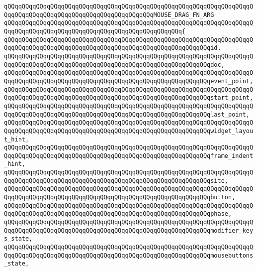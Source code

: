 \verb|qQQqqQQqqQQqqQQqqQQqqQQqqQQqqQQqqQQqqQQqqQQqqQQqqQQqqQQqqQQqqQQqqQQqqQQqqQQqqQQqqQQqqQQqqQQqqQQqqQQqqQQqqQQqqQQqMOUSE_DRAG_FN_ARG|\newline
\verb|qQQqqQQqqQQqqQQqqQQqqQQqqQQqqQQqqQQqqQQqqQQqqQQqqQQqqQQqqQQqqQQqqQQqqQQqqQQqqQQqqQQqqQQqqQQqqQQqqQQqqQQqqQQqqQQqqQQqqQQq{|\newline
\verb|qQQqqQQqqQQqqQQqqQQqqQQqqQQqqQQqqQQqqQQqqQQqqQQqqQQqqQQqqQQqqQQqqQQqqQQqqQQqqQQqqQQqqQQqqQQqqQQqqQQqqQQqqQQqqQQqqQQqqQQqqQQqqQQqid,|\newline
\verb|qQQqqQQqqQQqqQQqqQQqqQQqqQQqqQQqqQQqqQQqqQQqqQQqqQQqqQQqqQQqqQQqqQQqqQQqqQQqqQQqqQQqqQQqqQQqqQQqqQQqqQQqqQQqqQQqqQQqqQQqqQQqqQQqdoc,|\newline
\verb|qQQqqQQqqQQqqQQqqQQqqQQqqQQqqQQqqQQqqQQqqQQqqQQqqQQqqQQqqQQqqQQqqQQqqQQqqQQqqQQqqQQqqQQqqQQqqQQqqQQqqQQqqQQqqQQqqQQqqQQqqQQqqQQqevent_point,|\newline
\verb|qQQqqQQqqQQqqQQqqQQqqQQqqQQqqQQqqQQqqQQqqQQqqQQqqQQqqQQqqQQqqQQqqQQqqQQqqQQqqQQqqQQqqQQqqQQqqQQqqQQqqQQqqQQqqQQqqQQqqQQqqQQqqQQqstart_point,|\newline
\verb|qQQqqQQqqQQqqQQqqQQqqQQqqQQqqQQqqQQqqQQqqQQqqQQqqQQqqQQqqQQqqQQqqQQqqQQqqQQqqQQqqQQqqQQqqQQqqQQqqQQqqQQqqQQqqQQqqQQqqQQqqQQqqQQqlast_point,|\newline
\verb|qQQqqQQqqQQqqQQqqQQqqQQqqQQqqQQqqQQqqQQqqQQqqQQqqQQqqQQqqQQqqQQqqQQqqQQqqQQqqQQqqQQqqQQqqQQqqQQqqQQqqQQqqQQqqQQqqQQqqQQqqQQqqQQqwidget_layout_hint,|\newline
\verb|qQQqqQQqqQQqqQQqqQQqqQQqqQQqqQQqqQQqqQQqqQQqqQQqqQQqqQQqqQQqqQQqqQQqqQQqqQQqqQQqqQQqqQQqqQQqqQQqqQQqqQQqqQQqqQQqqQQqqQQqqQQqqQQqframe_indent_hint,|\newline
\verb|qQQqqQQqqQQqqQQqqQQqqQQqqQQqqQQqqQQqqQQqqQQqqQQqqQQqqQQqqQQqqQQqqQQqqQQqqQQqqQQqqQQqqQQqqQQqqQQqqQQqqQQqqQQqqQQqqQQqqQQqqQQqqQQqsite,|\newline
\verb|qQQqqQQqqQQqqQQqqQQqqQQqqQQqqQQqqQQqqQQqqQQqqQQqqQQqqQQqqQQqqQQqqQQqqQQqqQQqqQQqqQQqqQQqqQQqqQQqqQQqqQQqqQQqqQQqqQQqqQQqqQQqqQQqbutton,|\newline
\verb|qQQqqQQqqQQqqQQqqQQqqQQqqQQqqQQqqQQqqQQqqQQqqQQqqQQqqQQqqQQqqQQqqQQqqQQqqQQqqQQqqQQqqQQqqQQqqQQqqQQqqQQqqQQqqQQqqQQqqQQqqQQqqQQqphase,|\newline
\verb|qQQqqQQqqQQqqQQqqQQqqQQqqQQqqQQqqQQqqQQqqQQqqQQqqQQqqQQqqQQqqQQqqQQqqQQqqQQqqQQqqQQqqQQqqQQqqQQqqQQqqQQqqQQqqQQqqQQqqQQqqQQqqQQqmodifier_keys_state,|\newline
\verb|qQQqqQQqqQQqqQQqqQQqqQQqqQQqqQQqqQQqqQQqqQQqqQQqqQQqqQQqqQQqqQQqqQQqqQQqqQQqqQQqqQQqqQQqqQQqqQQqqQQqqQQqqQQqqQQqqQQqqQQqqQQqqQQqmousebuttons_state,|\newline
